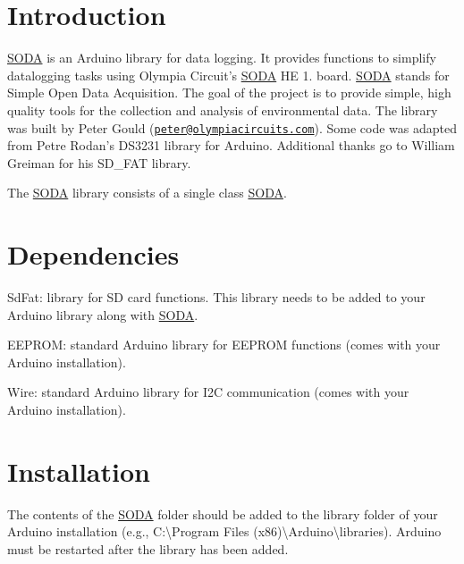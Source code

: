 \hypertarget{index_intro_sec}{}\section{Introduction}\label{index_intro_sec}
\hyperlink{class_s_o_d_a}{S\-O\-D\-A} is an Arduino library for data logging. It provides functions to simplify datalogging tasks using Olympia Circuit's \hyperlink{class_s_o_d_a}{S\-O\-D\-A} H\-E 1. board. \hyperlink{class_s_o_d_a}{S\-O\-D\-A} stands for Simple Open Data Acquisition. The goal of the project is to provide simple, high quality tools for the collection and analysis of environmental data. The library was built by Peter Gould (\href{mailto:peter@olympiacircuits.com}{\tt peter@olympiacircuits.\-com}). Some code was adapted from Petre Rodan's D\-S3231 library for Arduino. Additional thanks go to William Greiman for his S\-D\-\_\-\-F\-A\-T library.

The \hyperlink{class_s_o_d_a}{S\-O\-D\-A} library consists of a single class \hyperlink{class_s_o_d_a}{S\-O\-D\-A}. \hypertarget{index_dependencies_sec}{}\section{Dependencies}\label{index_dependencies_sec}
Sd\-Fat\-: library for S\-D card functions. This library needs to be added to your Arduino library along with \hyperlink{class_s_o_d_a}{S\-O\-D\-A}.

E\-E\-P\-R\-O\-M\-: standard Arduino library for E\-E\-P\-R\-O\-M functions (comes with your Arduino installation).

Wire\-: standard Arduino library for I2\-C communication (comes with your Arduino installation). \hypertarget{index_install_sec}{}\section{Installation}\label{index_install_sec}
The contents of the \hyperlink{class_s_o_d_a}{S\-O\-D\-A} folder should be added to the library folder of your Arduino installation (e.\-g., C\-:\textbackslash{}Program Files (x86)\textbackslash{}Arduino\textbackslash{}libraries). Arduino must be restarted after the library has been added. 